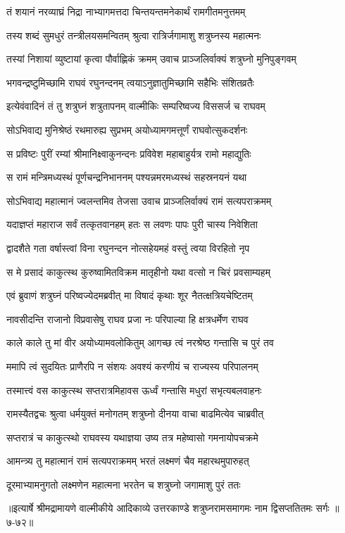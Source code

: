 
\twolineshloka
{तं शयानं नरव्याघ्रं निद्रा नाभ्यागमत्तदा}
{चिन्तयन्तमनेकार्थं रामगीतमनुत्तमम्} %

\twolineshloka
{तस्य शब्दं सुमधुरं तन्त्रीलयसमन्वितम्}
{श्रुत्वा रात्रिर्जगामाशु शत्रुघ्नस्य महात्मनः} %

\twolineshloka
{तस्यां निशायां व्युष्टायां कृत्वा पौर्वाह्णिकं क्रमम्}
{उवाच प्राञ्जलिर्वाक्यं शत्रुघ्नो मुनिपुङ्गवम्} %

\twolineshloka
{भगवन्द्रष्टुमिच्छामि राघवं रघुनन्दनम्}
{त्वयाऽनुज्ञातुमिच्छामि सहैभिः संशितव्रतैः} %

\twolineshloka
{इत्येवंवादिनं तं तु शत्रुघ्नं शत्रुतापनम्}
{वाल्मीकिः सम्परिष्वज्य विससर्ज च राघवम्} %

\twolineshloka
{सोऽभिवाद्य मुनिश्रेष्ठं रथमारुह्य सुप्रभम्}
{अयोध्यामगमत्तूर्णं राघवोत्सुकदर्शनः} %

\twolineshloka
{स प्रविष्टः पुरीं रम्यां श्रीमानिक्ष्वाकुनन्दनः}
{प्रविवेश महाबाहुर्यत्र रामो महाद्युतिः} %

\twolineshloka
{स रामं मन्त्रिमध्यस्थं पूर्णचन्द्रनिभाननम्}
{पश्यन्नमरमध्यस्थं सहस्रनयनं यथा} %

\twolineshloka
{सोऽभिवाद्य महात्मानं ज्वलन्तमिव तेजसा}
{उवाच प्राञ्जलिर्वाक्यं रामं सत्यपराक्रमम्} %

\twolineshloka
{यदाज्ञप्तं महाराज सर्वं तत्कृतवानहम्}
{हतः स लवणः पापः पुरी चास्य निवेशिता} %

\twolineshloka
{द्वादशैते गता वर्षास्त्वां विना रघुनन्दन}
{नोत्सहेयमहं वस्तुं त्वया विरहितो नृप} %

\twolineshloka
{स मे प्रसादं काकुत्स्थ कुरुष्वामितविक्रम}
{मातृहीनो यथा वत्सो न चिरं प्रवसाम्यहम्} %

\twolineshloka
{एवं ब्रुवाणं शत्रुघ्नं परिष्वज्येदमब्रवीत्}
{मा विषादं कृथाः शूर नैतत्क्षत्रियचेष्टितम्} %

\twolineshloka
{नावसीदन्ति राजानो विप्रवासेषु राघव}
{प्रजा नः परिपाल्या हि क्षत्रधर्मेण राघव} %

\twolineshloka
{काले काले तु मां वीर अयोध्यामवलोकितुम्}
{आगच्छ त्वं नरश्रेष्ठ गन्तासि च पुरं तव} %

\twolineshloka
{ममापि त्वं सुदयितः प्राणैरपि न संशयः}
{अवश्यं करणीयं च राज्यस्य परिपालनम्} %

\twolineshloka
{तस्मात्त्वं वस काकुत्स्थ सप्तरात्रमिहावस}
{ऊर्ध्वं गन्तासि मधुरां सभृत्यबलवाहनः} %

\twolineshloka
{रामस्यैतद्वचः श्रुत्वा धर्मयुक्तं मनोगतम्}
{शत्रुघ्नो दीनया वाचा बाढमित्येव चाब्रवीत्} %

\twolineshloka
{सप्तरात्रं च काकुत्स्थो राघवस्य यथाज्ञया}
{उष्य तत्र महेष्वासो गमनायोपचक्रमे} %

\twolineshloka
{आमन्त्र्य तु महात्मानं रामं सत्यपराक्रमम्}
{भरतं लक्ष्मणं चैव महारथमुपारुहत्} %

\twolineshloka
{दूरमाभ्यामनुगतो लक्ष्मणेन महात्मना}
{भरतेन च शत्रुघ्नो जगामाशु पुरं ततः} %


॥इत्यार्षे श्रीमद्रामायणे वाल्मीकीये आदिकाव्ये उत्तरकाण्डे शत्रुघ्नरामसमागमः नाम द्विसप्ततितमः सर्गः ॥७-७२॥
